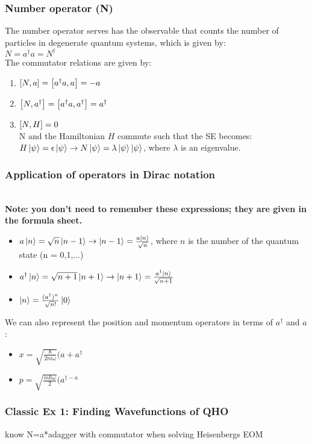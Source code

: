 \documentclass[]{article}
\begin{document}
\subsubsection{Number operator (N)}
The number operator serves has the observable that counts the number of particles in degenerate quantum systems, which is given by:\\
$N = a^{\dagger}a = N^{\dagger}$\\
The commutator relations are given by:
\begin{enumerate}
    \item $\comm{N}{a} = \comm{a^{\dagger}a}{a} = -a$
    \item $\comm{N}{a^{\dagger}} = \comm{a^{\dagger}a}{a^{\dagger}} = a^{\dagger}$
    \item $\comm{N}{H} = 0$\\
    N and the Hamiltonian $H$ commute such that the SE becomes:\\
    $H\ket{\psi} = \epsilon \ket{\psi} \rightarrow N\ket{\psi} = \lambda\ket{\psi} \ket{\psi}$, where $\lambda$ is an eigenvalue.
\end{enumerate}
\subsubsection{Application of operators in Dirac notation}\\
\textbf{Note: you don't need to remember these expressions; they are given in the formula sheet.} 
\begin{itemize}
    \item $a\ket{n} = \sqrt{n}\ket{n-1} \rightarrow \ket{n-1} = \frac{a\ket{n}}{\sqrt{n}}$, where $n$ is the number of the quantum state (n = 0,1,...)
    \item $a^{\dagger}\ket{n} = \sqrt{n+1}\ket{n+1} \rightarrow \ket{n+1} = \frac{a^{\dagger}\ket{n}}{\sqrt{n+1}}$
    \item $\ket{n} = \frac{(a^{\dagger})^n}{\sqrt{n}!}\ket{0}$
\end{itemize}
We can also represent the position and momentum operators in terms of $a^{\dagger}$ and $a$:
\begin{itemize}
    \item $x = \sqrt{\frac{\hbar}{2m\omega}}(a + a^{\dagger}$
    \item $p = \sqrt{\frac{m\hbar\omega}{2}}(a^{\dagger - a}$
\end{itemize}




\subsubsection{Classic Ex 1: Finding Wavefunctions of QHO}
know N=a*adagger with commutator when solving Heisenbergs EOM
\end{document}

